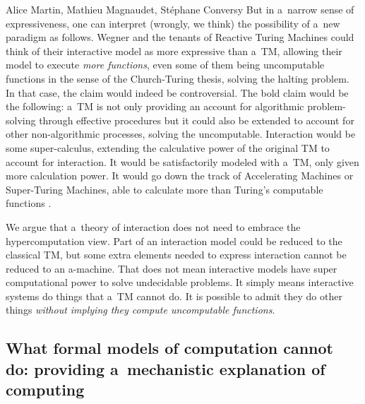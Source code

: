 \begin{artengenv2auth}{Alice Martin, Mathieu Magnaudet, Stéphane Conversy}
But in a~narrow sense of expressiveness, one can interpret (wrongly, we think) the possibility of a~new paradigm as follows. Wegner and the tenants of Reactive Turing Machines could think of their interactive model as more expressive than a~TM, allowing their model to execute \textit{more functions}, even some of them being uncomputable functions in the sense of the Church-Turing thesis, solving the halting problem. In that case, the claim would indeed be controversial. The bold claim would be the following: a~TM is not only providing an account for algorithmic problem-solving through effective procedures but it could also be extended to account for other non-algorithmic processes, solving the uncomputable. Interaction would be some super-calculus, extending the calculative power of the original TM to account for interaction. It would be satisfactorily modeled with a~TM, only given more calculation power. It would go down the track of Accelerating Machines or Super-Turing Machines, able to calculate more than Turing's computable functions \cite{Copeland2002, Copeland2011, MacLennan2009}. 

We argue that a~theory of interaction does not need to embrace the hypercomputation view. Part of an interaction model could be reduced to the classical TM, but some extra elements needed to express interaction cannot be reduced to an a-machine. That does not mean interactive models have super computational power to solve undecidable problems. It simply means interactive systems do things that a~TM cannot do. It is possible to admit they do other things \textit{without implying they compute uncomputable functions}. 


\subsection{What formal models of computation cannot do: providing a~mechanistic explanation of computing}


\end{artengenv2auth}
